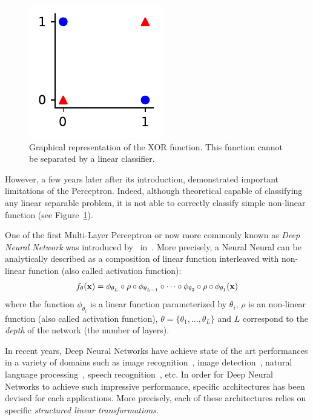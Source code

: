 \begin{figure}[htb]
  \centering
  \includegraphics{figures/chapter1/xor_function.pdf}
  \caption{Graphical representation of the XOR function. This function cannot be separated by a linear classifier.}
  \label{figure:xor_function}
\end{figure}

However, a few years later after its introduction, \citet{minsky1969perceptrons} demonstrated important limitations of the Perceptron.
Indeed, although theoretical capable of classifying any linear separable problem, it is not able to correctly classify simple non-linear function (see Figure~\ref{figure:xor_function}).

One of the first Multi-Layer Perceptron or now more commonly known as \emph{Deep Neural Network} was introduced by~\citeauthor{ivakhnenko1967cybernetics} in~\citeyear{ivakhnenko1967cybernetics}.
More precisely, a Neural Neural can be analytically described as a composition of linear function interleaved with non-linear function (also called activation function):
\begin{equation}
  f_\theta(\mathbf{x}) = \phi_{\theta_L} \circ \rho \circ \phi_{\theta_{L-1}} \circ \cdots \circ \phi_{\theta_2} \circ \rho \circ \phi_{\theta_1}(\mathbf{x})
  \label{equation:neural_network}
\end{equation}
where the function $\phi_{\theta_i}$ is a linear function parameterized by $\theta_i$, $\rho$ is an non-linear function (also called activation function), $\theta = \{\theta_1, \dots, \theta_L \}$ and $L$ correspond to the \emph{depth} of the network (\ie the number of layers).

In recent years, Deep Neural Networks have achieve state of the art performances in a variety of domains such as image recognition~\cite{lecun1998gradient,krizhevsky2012imagenet,He_2016_CVPR,tan2019efficientnet}, image detection~\cite{redmon2016you}, natural language processing~\cite{radford2018Language}, speech recognition~\cite{hinton2012deep}, etc. 
In order for Deep Neural Networks to achieve such impressive performance, specific architectures has been devised for each applications.
More precisely, each of these architectures relies on specific \emph{structured linear transformations}.


